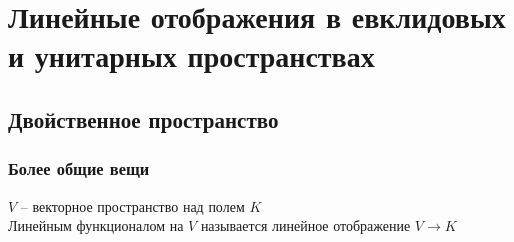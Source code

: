 \chapter{Линейные отображения в евклидовых и унитарных пространствах}

\section{Двойственное пространство}

\subsection{Более общие вещи}

\begin{definition}
	$ V $ -- векторное пространство над полем $ K $ \\
	Линейным функционалом на $ V $ называется линейное отображение $ V \to K $
\end{definition}

